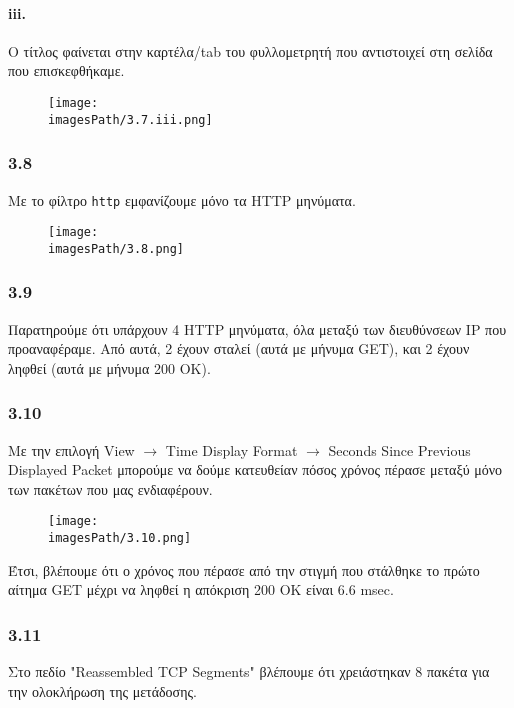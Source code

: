 			
			\paragraph{iii.}
				Ο τίτλος φαίνεται στην καρτέλα/tab του φυλλομετρητή που αντιστοιχεί στη σελίδα που επισκεφθήκαμε.
				
				\begin{figure}[H]
					\texttt{[image: \\imagesPath/3.7.iii.png]}
				\end{figure}
		
		\subsubsection*{3.8}
			Με το φίλτρο \verb|http| εμφανίζουμε μόνο τα HTTP μηνύματα. 
			
			\begin{figure}[H]
				\texttt{[image: \\imagesPath/3.8.png]}
			\end{figure}
			
		
		\subsubsection*{3.9}
			Παρατηρούμε ότι υπάρχουν 4 HTTP μηνύματα, όλα μεταξύ των διευθύνσεων IP που προαναφέραμε. Από αυτά, 2 έχουν σταλεί (αυτά με μήνυμα GET), και 2 έχουν ληφθεί (αυτά με μήνυμα 200 OK).
		
		\subsubsection*{3.10}
			Με την επιλογή View $\rightarrow$ Time Display Format $\rightarrow$ Seconds Since Previous Displayed Packet μπορούμε να δούμε κατευθείαν πόσος χρόνος πέρασε μεταξύ μόνο των πακέτων που μας ενδιαφέρουν.
			
			\begin{figure}[H]
				\texttt{[image: \\imagesPath/3.10.png]}
			\end{figure}
		
			Έτσι, βλέπουμε ότι ο χρόνος που πέρασε από την στιγμή που στάλθηκε το πρώτο αίτημα GET μέχρι να ληφθεί η απόκριση 200 OK είναι 6.6 msec.
			
		\subsubsection*{3.11}
		
			Στο πεδίο "Reassembled TCP Segments" βλέπουμε ότι χρειάστηκαν 8 πακέτα για την ολοκλήρωση της μετάδοσης.
		
